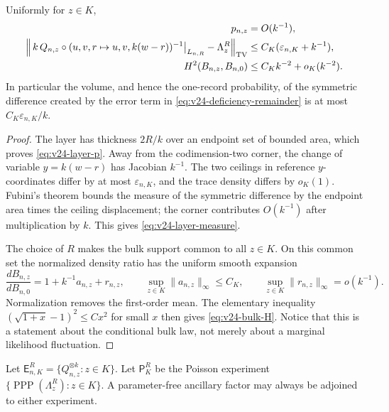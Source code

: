\begin{lemma}
\label{lem:v24-layer-bulk-bounds}
Uniformly for \(z\in K\),
\begin{align}
 p_{n,z}&=O(k^{-1}),                                           \label{eq:v24-layer-p}\\
 \left\|\,k\,Q_{n,z}\circ(u,v,r\mapsto u,v,k(w-r))^{-1}
       \big|_{L_{n,R}}-\Lambda_z^R\right\|_{\rm TV}
 &\le C_K(\varepsilon_{n,K}+k^{-1}),                         \label{eq:v24-layer-measure}\\
 H^2(B_{n,z},B_{n,0})&\le C_Kk^{-2}+o_K(k^{-2}).              \label{eq:v24-bulk-H}
\end{align}
In particular the volume, and hence the one-record probability, of the
symmetric difference created by the error term in
\eqref{eq:v24-deficiency-remainder} is at most
\(C_K\varepsilon_{n,K}/k\).
\end{lemma}

\begin{proof}
The layer has thickness \(2R/k\) over an endpoint set of bounded area, which
proves \eqref{eq:v24-layer-p}.  Away from the codimension-two corner, the
change of variable \(y=k(w-r)\) has Jacobian \(k^{-1}\).  The two ceilings in
reference \(y\)-coordinates differ by at most \(\varepsilon_{n,K}\), and the
trace density differs by \(o_K(1)\).  Fubini's theorem bounds the measure of
the symmetric difference by the endpoint area times the ceiling displacement;
the corner contributes \(O(k^{-1})\) after multiplication by \(k\).  This
gives \eqref{eq:v24-layer-measure}.

The choice of \(R\) makes the bulk support common to all \(z\in K\).  On this
common set the normalized density ratio has the uniform smooth expansion
\[
 \frac{dB_{n,z}}{dB_{n,0}}
 =1+k^{-1}a_{n,z}+r_{n,z},
 \qquad
 \sup_{z\in K}\|a_{n,z}\|_\infty\le C_K,
 \qquad
 \sup_{z\in K}\|r_{n,z}\|_\infty=o(k^{-1}).
\]
Normalization removes the first-order mean.  The elementary inequality
\((\sqrt{1+x}-1)^2\le Cx^2\) for small \(x\) then gives
\eqref{eq:v24-bulk-H}.  Notice that this is a statement about the conditional
bulk law, not merely about a marginal likelihood fluctuation.
\end{proof}

Let \(\mathsf E_{n,K}^R=\{Q_{n,z}^{\otimes k}:z\in K\}\).  Let
\(\mathsf P_K^R\) be the Poisson experiment
\(\{\operatorname{PPP}(\Lambda_z^R):z\in K\}\).  A parameter-free ancillary
factor may always be adjoined to either experiment.

